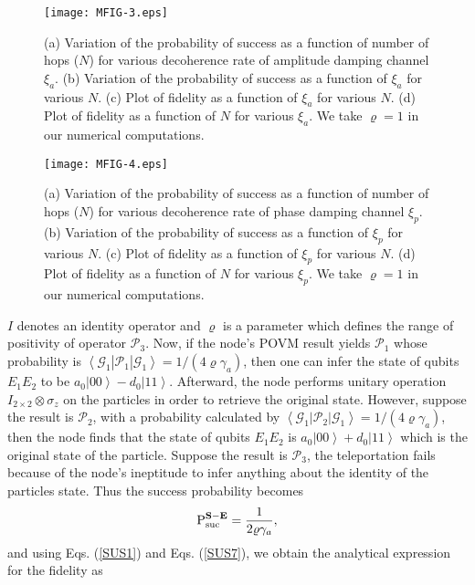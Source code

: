 \documentclass[aps,pra,twocolumn,showpacs,superscriptaddress,groupedaddress]{revtex4}
\begin{document}
\begin{figure*}[!t]
\centering \texttt{[image: MFIG-3.eps]}
\caption{\protect\footnotesize (a) Variation of the probability of success as a function of number of hops ($N$) for various decoherence rate of amplitude damping channel $\xi_a$.  (b) Variation of the probability of success as a function of $\xi_a$ for various $N$. (c) Plot of fidelity as a function of $\xi_a$ for various $N$. (d) Plot of fidelity as a function of $N$ for various $\xi_a$.   We take $\varrho=1$ in our numerical computations.} 
\label{Mfig3}
\end{figure*}
\begin{figure*}[!t]
\centering \texttt{[image: MFIG-4.eps]}
\caption{\protect\footnotesize (a) Variation of the probability of success as a function of number of hops ($N$) for various decoherence rate of phase damping channel $\xi_p$.  (b) Variation of the probability of success as a function of $\xi_p$ for various $N$. (c) Plot of fidelity as a function of $\xi_p$ for various $N$. (d) Plot of fidelity as a function of $N$ for various $\xi_p$.   We take $\varrho=1$ in our numerical computations.} 
\label{Mfig4}
\end{figure*}
$I$ denotes an identity operator and $\varrho$ is a parameter which defines the range of positivity of operator $\mathcal{P}_3$. Now, if the node's POVM result yields $\mathcal{P}_1$ whose probability is $\left\langle\mathcal{G}_1\right|\mathcal{P}_1\left|\mathcal{G}_1\right\rangle=1/(4\varrho\gamma_a)$, then one can infer the state of qubits $E_1E_2$ to be $a_0\left|00\right\rangle-d_0\left|11\right\rangle$. Afterward, the node  performs unitary operation $I_{2\times 2}\otimes\sigma_z$ on the particles in order to retrieve the original state. However, suppose the result is $\mathcal{P}_2$, with a probability calculated by $\left\langle\mathcal{G}_1\right.|\mathcal{P}_2|\left.\mathcal{G}_1\right\rangle=1/(4\varrho\gamma_a)$, then the node finds that the state of qubits $E_1E_2$ is $a_0\left|00\right\rangle+d_0\left|11\right\rangle$ which is the original state of the particle.  Suppose the result is $\mathcal{P}_3$, the teleportation fails because of the node's ineptitude to infer anything about the identity of the particles state. Thus the success probability becomes
\begin{equation}
\text{P}_{\text{suc}}^{\rm\bf S-E}=\frac{1}{2\varrho\gamma_a},
\end{equation}
and using Eqs. (\ref{SUS1}) and Eqs. (\ref{SUS7}), we obtain the analytical expression for the fidelity as
\end{document}
